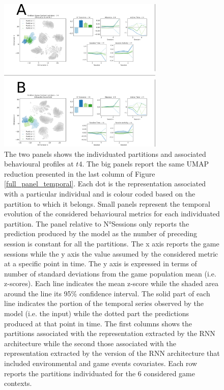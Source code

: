\begin{figure}[!htb]
\includegraphics[width=0.7\textwidth]{images/chapter_4/clust_beha.png}
\centering
\caption[\textbf{Partitions of the representations generated by the RNN architectures from the behavioural metrics}]{The two panels shows the individuated partitions and associated behavioural profiles at $t4$. The big panels report the same UMAP reduction presented in the last column of Figure \ref{full_panel_temporal}. Each dot is the representation associated with a particular individual and is colour coded based on the partition to which it belongs. Small panels represent the temporal evolution of the considered behavioural metrics for each individuated partition. The panel relative to N°Sessions only reports the prediction produced by the model as the number of preceding session is constant for all the partitions. The x axis reports the game sessions while the y axis the value assumed by the considered metric at a specific point in time. The y axis is expressed in terms of number of standard deviations from the game population mean (i.e. z-scores). Each line indicates the mean z-score while the shaded area around the line its 95\% confidence interval. The solid part of each line indicates the portion of the temporal series observed by the model (i.e. the input) while the dotted part the predictions produced at that point in time. The first columns shows the partitions associated with the representation extracted by the RNN architecture while the second those associated with the representation extracted by the version of the RNN architecture that included environmental and game events covariates. Each row reports the partitions individuated for the 6 considered game contexts.}
\label{partition_rnn_behaviour} 
\end{figure}


